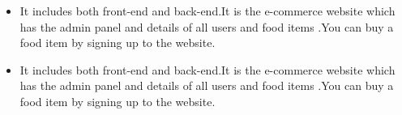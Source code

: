 \documentclass[10pt,a4paper]{altacv}
\begin{document}
\divider

\begin{itemize}
\item It includes both front-end and back-end.It is the e-commerce website which has the admin panel and details of all users and food items .You can buy a food item by signing up to the website.
\end{itemize}


\divider

\begin{itemize}
\item It includes both front-end and back-end.It is the e-commerce website which has the admin panel and details of all users and food items .You can buy a food item by signing up to the website.
\end{itemize}



\clearpage

\end{document}
